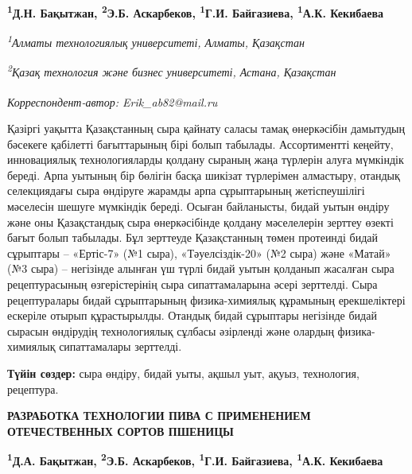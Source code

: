 
\begin{articleheader}

{\bfseries
\textsuperscript{1}Д.Н. Бақытжан\authorid,
\textsuperscript{2}Э.Б. Аскарбеков\textsuperscript{\envelope }\authorid,
\textsuperscript{1}Г.И. Байгазиева\authorid,
\textsuperscript{1}А.К. Кекибаева\authorid}
\end{articleheader}

\begin{affiliation}
\emph{\textsuperscript{1}Алматы технологиялық университеті, Алматы, Қазақстан}

\emph{\textsuperscript{2}Қазақ технология және бизнес университеті, Астана, Қазақстан}

\raggedright \textsuperscript{\envelope }{\em Корреспондент-автор: Erik\_ab82@mail.ru}
\end{affiliation}

Қазіргі уақытта Қазақстанның сыра қайнату саласы тамақ өнеркәсібін
дамытудың бәсекеге қабілетті бағыттарының бірі болып табылады.
Ассортиментті кеңейту, инновациялық технологияларды қолдану сыраның жаңа
түрлерін алуға мүмкіндік береді. Арпа уытының бір бөлігін басқа шикізат
түрлерімен алмастыру, отандық селекциядағы сыра өндіруге жарамды арпа
сұрыптарының жетіспеушілігі мәселесін шешуге мүмкіндік береді. Осыған
байланысты, бидай уытын өндіру және оны Қазақстандық сыра өнеркәсібінде
қолдану мәселелерін зерттеу өзекті бағыт болып табылады. Бұл зерттеуде
Қазақстанның төмен протеинді бидай сұрыптары -- «Ертіс-7» (№1 сыра),
«Тәуелсіздік-20» (№2 сыра) және «Матай» (№3 сыра) -- негізінде алынған
үш түрлі бидай уытын қолданып жасалған сыра рецептурасының
өзгерістерінің сыра сипаттамаларына әсері зерттелді. Сыра рецептуралары
бидай сұрыптарының физика-химиялық құрамының ерекшеліктері ескеріле
отырып құрастырылды. Отандық бидай сұрыптары негізінде бидай сырасын
өндірудің технологиялық сұлбасы әзірленді және олардың физика-химиялық
сипаттамалары зерттелді.

{\bfseries Түйін сөздер:} сыра өндіру, бидай уыты, ақшыл уыт, ақуыз,
технология, рецептура.

\begin{articleheader}
{\bfseries РАЗРАБОТКА ТЕХНОЛОГИИ ПИВА С ПРИМЕНЕНИЕМ ОТЕЧЕСТВЕННЫХ СОРТОВ ПШЕНИЦЫ}

{\bfseries
\textsuperscript{1}Д.А. Бақытжан,
\textsuperscript{2}Э.Б. Аскарбеков\textsuperscript{\envelope },
\textsuperscript{1}Г.И. Байгазиева,
\textsuperscript{1}А.К. Кекибаева}
\end{articleheader}

